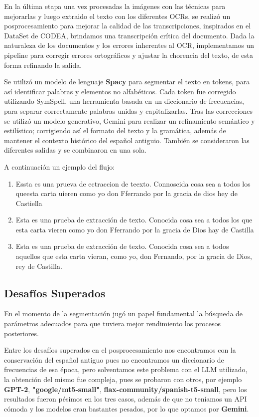 \documentclass[11pt,a4paper]{article}
\begin{document}
En la \'ultima etapa una vez procesadas la im\'agenes con las t\'ecnicas para mejorarlas y luego extraido el texto con los diferentes OCRs, se realiz\'o un posprocesamiento para mejorar la calidad de las transcripciones, inspirados en el DataSet de CODEA, brindamos una transcripción cr\'itica del documento. Dada la naturaleza de los documentos y los errores inherentes al OCR, implementamos un pipeline para corregir errores ortogr\'aficos y ajustar la chorencia del texto, de esta forma refinando la salida.

Se utiliz\'o un modelo de lenguaje \textbf{Spacy} para segmentar el texto en tokens, para as\'i identificar palabras y elementos no alfab\'eticos. Cada token fue corregido utilizando SymSpell, una herramienta basada en un diccionario de frecuencias, para separar correctamente palabras unidas y capitalizarlas. Tras  las correcciones se utiliz\'o un modelo generativo, Gemini para realizar un refinamiento sem\'antico y estil\'istico; corrigiendo as\'i el formato del texto y la gram\'atica, adem\'as de mantener el contexto hist\'orico del español antiguio. Tambi\'en se consideraron las diferentes salidas y se combinaron en una sola.

A continuaci\'on un ejemplo del flujo:

\begin{enumerate}
    \item Essta es una prueva de ectraccion de teexto. Connoscida cosa sea a todos los queesta carta uieren como yo don Fferrando por la gracia de dios hey de Castiella
    \item Esta es una prueba de extracción de texto. Conocida cosa sea a todos los que esta carta vieren como yo don Fferrando por la gracia de Dios hay de Castilla
    \item Esta es una prueba de extracción de texto. Conocida cosa sea a todos aquellos que esta carta vieran, como yo, don Fernando, por la gracia de Dios, rey de Castilla.
\end{enumerate}

\subsection{Desafíos Superados}

En el momento de la segmentación jug\'o un papel fundamental la b\'usqueda de par\'ametros adecuados para que tuviera mejor rendimiento los procesos posteriores.

Entre los desaf\'ios superados en el posprocesamiento nos encontramos con la conservaci\'on del español antiguo pues no encontramos un diccionario de frecuencias de esa época, pero solventamos este problema con el LLM utilizado, la obtención del mismo fue compleja, pues se probaron con otros, por ejemplo \textbf{GPT-2}, \textbf{"google/mt5-small"}, \textbf{flax-community/spanish-t5-small}, pero los resultados fueron p\'esimos en los tres casos, adem\'as de que no ten\'iamos un API c\'omoda y los modelos eran bastantes pesados, por lo que optamos por \textbf{Gemini}.
\end{document}
